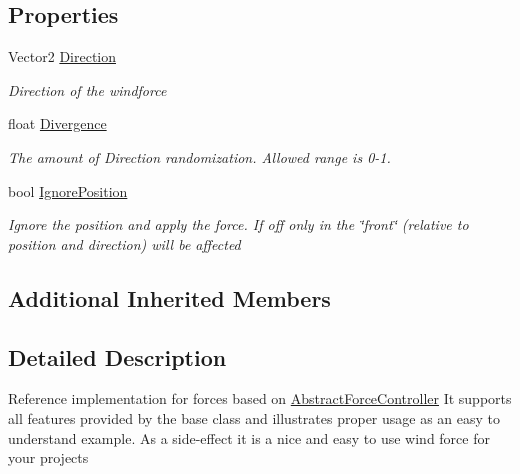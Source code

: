 \subsection*{Properties}
\begin{DoxyCompactItemize}
\item 
Vector2 \hyperlink{class_farseer_physics_1_1_controllers_1_1_simple_wind_force_a21a98a90b15e78aba9fc26e0bb4273aa}{Direction}
\begin{DoxyCompactList}\small\item\em Direction of the windforce \end{DoxyCompactList}\item 
float \hyperlink{class_farseer_physics_1_1_controllers_1_1_simple_wind_force_a292d13f027c27324198e6c41cf6fb5e8}{Divergence}
\begin{DoxyCompactList}\small\item\em The amount of Direction randomization. Allowed range is 0-\/1. \end{DoxyCompactList}\item 
bool \hyperlink{class_farseer_physics_1_1_controllers_1_1_simple_wind_force_ab81eaaca5b969766697c187fff14ad8c}{Ignore\+Position}
\begin{DoxyCompactList}\small\item\em Ignore the position and apply the force. If off only in the \char`\"{}front\char`\"{} (relative to position and direction) will be affected \end{DoxyCompactList}\end{DoxyCompactItemize}
\subsection*{Additional Inherited Members}


\subsection{Detailed Description}
Reference implementation for forces based on \hyperlink{class_farseer_physics_1_1_controllers_1_1_abstract_force_controller}{Abstract\+Force\+Controller} It supports all features provided by the base class and illustrates proper usage as an easy to understand example. As a side-\/effect it is a nice and easy to use wind force for your projects 



